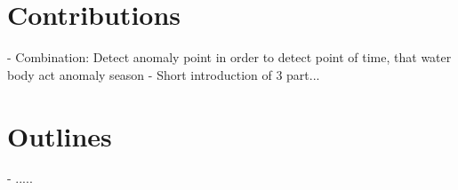 



\section{Contributions} %

- Combination: Detect anomaly point in order to detect point of time, that water body act anomaly season
- Short introduction of 3 part...

\section{Outlines} %
- .....
\fi
